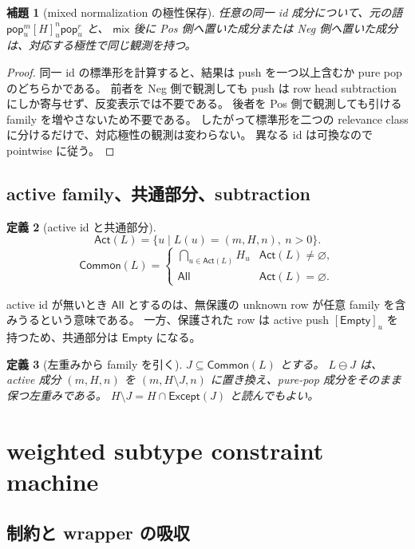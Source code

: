 \documentclass[uplatex,dvipdfmx,a4paper,10.5pt]{jsarticle}
\theoremstyle{jpplain}
\newtheorem{definition}{定義}[section]
\newtheorem{lemma}[definition]{補題}
\newcommand{\All}{\mathsf{All}}
\newcommand{\Empty}{\mathsf{Empty}}
\newcommand{\Common}{\mathsf{Common}}
\newcommand{\mix}{\mathsf{mix}}
\newcommand{\takeop}[2]{[#1]_{#2}}
\newcommand{\popop}[1]{\mathsf{pop}_{#1}}
\begin{document}
\begin{lemma}[mixed normalization の極性保存]
任意の同一 id 成分について、元の語
$\popop{u}^{m}\takeop{H}{u}^{n}\popop{u}^{r}$ と、
$\mix$ 後に Pos 側へ置いた成分または Neg 側へ置いた成分は、対応する極性で同じ観測を持つ。
\end{lemma}

\begin{proof}
同一 id の標準形を計算すると、結果は push を一つ以上含むか pure pop のどちらかである。
前者を Neg 側で観測しても push は row head subtraction にしか寄与せず、反変表示では不要である。
後者を Pos 側で観測しても引ける family を増やさないため不要である。
したがって標準形を二つの relevance class に分けるだけで、対応極性の観測は変わらない。
異なる id は可換なので pointwise に従う。
\end{proof}

\subsection{active family、共通部分、subtraction}

\begin{definition}[active id と共通部分]
\[
  \mathsf{Act}(L)=\{u\mid L(u)=(m,H,n),\ n>0\}.
\]
\[
  \Common(L)=
  \begin{cases}
    \displaystyle\bigcap_{u\in\mathsf{Act}(L)} H_u & \mathsf{Act}(L)\neq\varnothing,\\
    \All & \mathsf{Act}(L)=\varnothing.
  \end{cases}
\]
\end{definition}

active id が無いとき $\All$ とするのは、無保護の unknown row が任意 family を含みうるという意味である。
一方、保護された row は active push $\takeop{\Empty}{u}$ を持つため、共通部分は $\Empty$ になる。

\begin{definition}[左重みから family を引く]
$J\subseteq\Common(L)$ とする。
$L\ominus J$ は、active 成分
$(m,H,n)$ を $(m,H\setminus J,n)$ に置き換え、pure-pop 成分をそのまま保つ左重みである。
$H\setminus J=H\cap\mathsf{Except}(J)$ と読んでもよい。
\end{definition}

\section{weighted subtype constraint machine}

\subsection{制約と wrapper の吸収}
\end{document}
